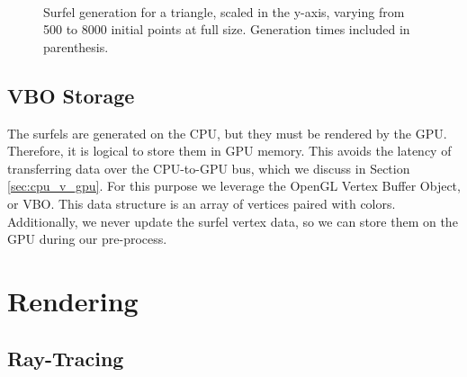 \begin{figure}[h!]
   \\
   \captionfonts
   \caption[Triangle surfels at full size]{Surfel generation for a triangle, scaled in the y-axis, varying from 500 to 8000 initial points at full size. Generation times included in parenthesis.}
   \label{fig:triangle_surfels}
\end{figure}

\subsection{VBO Storage}
\label{sec:VBOStorage}

The surfels are generated on the CPU, but they must be rendered by the GPU. Therefore, it is logical to store them in GPU memory. This avoids the latency of transferring data over the CPU-to-GPU bus, which we discuss in Section \ref{sec:cpu_v_gpu}. For this purpose we leverage the OpenGL Vertex Buffer Object, or VBO. This data structure is an array of vertices paired with colors. Additionally, we never update the surfel vertex data, so we can store them on the GPU during our pre-process.

\section{Rendering}
\label{sec:rendering}

\subsection{Ray-Tracing}

